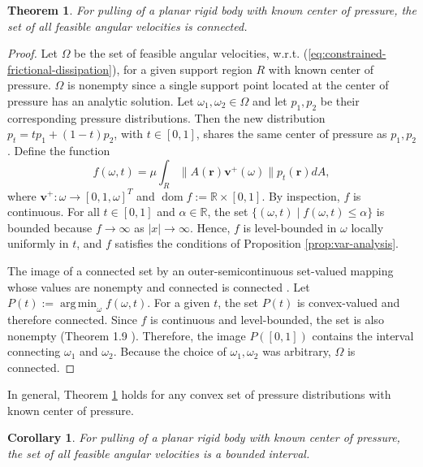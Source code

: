 \documentclass[conference]{IEEEtran}
\newtheorem{theorem}{Theorem}
\newtheorem{corollary}{Corollary}
\DeclareMathOperator*{\argmin}{arg\,min}
\DeclareMathOperator{\dom}{dom}
\begin{document}
\begin{theorem}\label{thm:angular-velocities}
  For pulling of a planar rigid body with known center of pressure,
  the set of all feasible angular velocities is connected.
\end{theorem}

\begin{proof}
  Let $\Omega$ be the set of feasible angular velocities,
  w.r.t. (\ref{eq:constrained-frictional-dissipation}), for a given
  support region $R$ with known center of pressure. $\Omega$ is
  nonempty since a single support point located at the center of
  pressure has an analytic solution. Let
  $\omega_1, \omega_2 \in \Omega$ and let $p_1, p_2$ be their
  corresponding pressure distributions. Then the new distribution
  $p_t = tp_1 + (1-t)p_2$, with $t \in [0,1]$, shares the same center
  of pressure as $p_1,p_2$. Define the function
  \begin{equation}
    f(\omega, t) = \mu\int_R\lVert A(\mathbf{r})\mathbf{v}^+(\omega)\rVert p_t(\mathbf{r})dA,
  \end{equation}
  where $\mathbf{v}^+: \omega \rightarrow [0,1,\omega]^T$ and
  $\dom f:= \mathbb{R}\times[0,1]$. By inspection, $f$ is
  continuous. For all $t \in [0,1]$ and $\alpha \in \mathbb{R}$, the
  set $\{(\omega,t)\;|\;f(\omega,t)\leq \alpha\}$ is bounded because
  $f \rightarrow \infty$ as $|x|\rightarrow \infty$. Hence, $f$ is
  level-bounded in $\omega$ locally uniformly in $t$, and $f$
  satisfies the conditions of Proposition \ref{prop:var-analysis}.

  The image of a connected set by an outer-semicontinuous set-valued
  mapping whose values are nonempty and connected is connected
  \cite{hiriart1985images}. Let $P(t) := \argmin_\omega f(\omega,t)$.
  For a given $t$, the set $P(t)$ is convex-valued and therefore
  connected. Since $f$ is continuous and level-bounded, the set is
  also nonempty (Theorem 1.9 \cite{Rockafellar}). Therefore, the image
  $P([0,1])$ contains the interval connecting $\omega_1$ and
  $\omega_2$. Because the choice of $\omega_1,\omega_2$ was arbitrary,
  $\Omega$ is connected.
\end{proof}

In general, Theorem \ref{thm:angular-velocities} holds for any convex%
set of pressure distributions with known center of pressure.


\begin{corollary}
  For pulling of a planar rigid body with known center of pressure,
  the set of all feasible angular velocities is a bounded interval.
\end{corollary}
\end{document}
